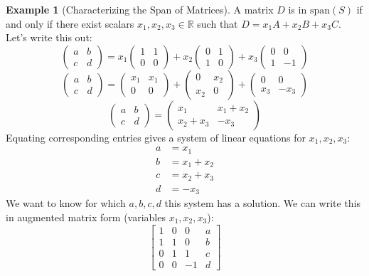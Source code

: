 \documentclass[11pt]{article}
\theoremstyle{definition}
\newtheorem{example}[theorem]{Example}
\newcommand{\R}{\mathbb{R}}
\newcommand{\Span}[1]{\text{span}(#1)}
\begin{document}
\begin{example}[Characterizing the Span of Matrices]
A matrix $D$ is in $\Span{S}$ if and only if there exist scalars $x_1, x_2, x_3 \in \R$ such that $D = x_1 A + x_2 B + x_3 C$.
Let's write this out:
\[ \begin{pmatrix} a & b \\ c & d \end{pmatrix} = x_1 \begin{pmatrix} 1 & 1 \\ 0 & 0 \end{pmatrix} + x_2 \begin{pmatrix} 0 & 1 \\ 1 & 0 \end{pmatrix} + x_3 \begin{pmatrix} 0 & 0 \\ 1 & -1 \end{pmatrix} \]
\[ \begin{pmatrix} a & b \\ c & d \end{pmatrix} = \begin{pmatrix} x_1 & x_1 \\ 0 & 0 \end{pmatrix} + \begin{pmatrix} 0 & x_2 \\ x_2 & 0 \end{pmatrix} + \begin{pmatrix} 0 & 0 \\ x_3 & -x_3 \end{pmatrix} \]
\[ \begin{pmatrix} a & b \\ c & d \end{pmatrix} = \begin{pmatrix} x_1 & x_1 + x_2 \\ x_2 + x_3 & -x_3 \end{pmatrix} \]
Equating corresponding entries gives a system of linear equations for $x_1, x_2, x_3$:
\begin{align*} a &= x_1 \\ b &= x_1 + x_2 \\ c &= x_2 + x_3 \\ d &= -x_3 \end{align*}
We want to know for which $a, b, c, d$ this system has a solution. We can write this in augmented matrix form (variables $x_1, x_2, x_3$):
\[ \left[ \begin{array}{ccc|c} 1 & 0 & 0 & a \\ 1 & 1 & 0 & b \\ 0 & 1 & 1 & c \\ 0 & 0 & -1 & d \end{array} \right] \]

\end{example}
\end{document}
